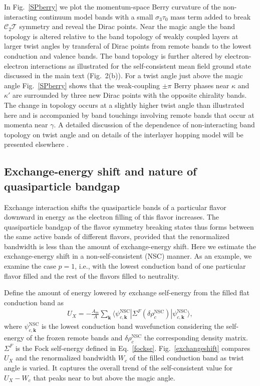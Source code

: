 \documentclass[aps,prl,reprint,amssymb,groupedaddress,twocolumn]{revtex4}
\newcommand{\CT}{$\mathcal{C}_2\mathcal{T}$ }
\begin{document}
In Fig.~\ref{SPberry} we plot the momentum-space Berry curvature of the non-interacting continuum model 
bands with a small $\sigma_3 \tau_0$ mass term added to break \CT symmetry and 
reveal the Dirac points.  Near the magic angle the band topology is altered relative to the band topology 
of weakly coupled layers at larger twist angles by transferal of Dirac points from remote bands to the 
lowest conduction and valence bands.  The band topology is further altered by electron-electron interactions 
as illustrated for the self-consistent mean field ground state discussed in the main text (Fig.~2(b)). 
For a twist angle just above the magic angle Fig.~\ref{SPberry} shows that the weak-coupling $\pm \pi $ Berry phases near 
$\kappa$ and $\kappa'$ are surrounded by three new Dirac points with the opposite chirality bands.  The change 
in topology occurs  at a slightly higher twist angle than illustrated here and is accompanied by 
band touchings involving remote bands that occur at momenta near $\gamma$. 
A detailed discussion of the dependence of non-interacting band topology on twist angle and on details of the 
interlayer hopping model will be presented elsewhere \cite{XieMacDonald}.


\subsection{Exchange-energy shift and nature of quasiparticle bandgap}

Exchange interaction shifts the quasiparticle bands of a particular flavor downward in energy 
as the electron filling of this flavor increases.
The quasiparticle bandgap of the flavor symmetry breaking states thus forms  
between the same active bands of different flavors, provided that the renormalized bandwidth
is less than the amount of exchange-energy shift.
Here we estimate the exchange-energy shift in a non-self-consistent (NSC) manner. 
As an example, we examine the case $p=1$, i.e., 
with the lowest conduction band of one particular flavor filled and the rest of the flavors filled to neutrality.

Define the amount of energy lowered by exchange self-energy from the filled flat conduction band as
\begin{align}
U_X = - \frac{A_m}{A}\sum_{\bm{k}}\langle \psi^{\textrm{NSC}}_{c,\bm{k}}  |\Sigma^F(\delta\rho^{\textrm{NSC}}_c)| \psi^{\textrm{NSC}}_{c,\bm{k}}\rangle,
\end{align}
where $\psi^{\textrm{NSC}}_{c,\bm{k}}$ is the lowest conduction band wavefunction considering the self-energy of the frozen remote bands
and $\delta\rho^{\textrm{NSC}}_c$ the corresponding density matrix.
$\Sigma^F$ is the Fock self-energy defined in Eq.~\ref{fockse}.
Fig.~\ref{exchangeshift} compares $U_X$ and the renormalized bandwidth $W_c$ of the filled conduction band as twist angle is varied.
It captures the overall trend of the self-consistent value for $U_X-W_c$ that peaks near to but above the magic angle.   
\end{document}
